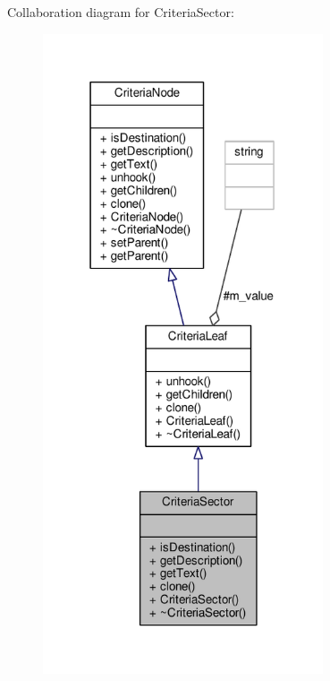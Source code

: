 Collaboration diagram for Criteria\+Sector\+:
\nopagebreak
\begin{figure}[H]
\begin{center}
\leavevmode
\includegraphics[width=235pt]{db/d26/classCriteriaSector__coll__graph}
\end{center}
\end{figure}
